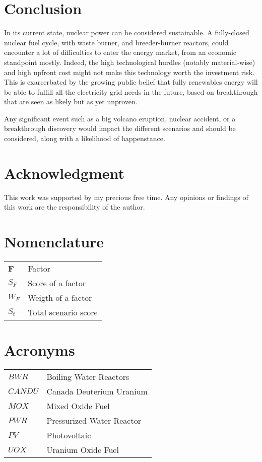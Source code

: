 \documentclass[IJPHM, 2017, 29]{PHMSociety}
\begin{document}
\section{Conclusion}
\label{sec:conclusion}

In its current state, nuclear power can be considered sustainable. A fully-closed nuclear fuel cycle, with waste burner, and breeder-burner reactors, could encounter a lot of difficulties to enter the energy market, from an economic standpoint mostly. Indeed, the high technological hurdles (notably material-wise) and high upfront cost might not make this technology worth the investment risk. This is exarcerbated by the growing public belief that fully renewables energy will be able to fulfill all the electricity grid needs in the future, based on breakthrough that are seen as likely but as yet unproven.

Any significant event such as a big volcano eruption, nuclear accident, or a breakthrough discovery would impact the different scenarios and should be considered, along with a likelihood of happenstance.


\section*{Acknowledgment}
This work was supported by my precious free time. Any opinions or findings of this work are the responsibility of the author.




\section*{Nomenclature}

\begin{tabular}{ l  l }
    \textbf{F}           &Factor\\
    \textbf{$S_F$}           &Score of a factor\\
    \textbf{$W_F$}           &Weigth of a factor\\
    \textbf{$S_t$}           &Total scenario score\\
 \end{tabular}


\section*{Acronyms}

\begin{tabular}{ l  l }
    $BWR$         &Boiling Water Reactors\\
    $CANDU$       &Canada Deuterium Uranium\\
    $MOX$         &Mixed Oxide Fuel\\
    $PWR$         &Pressurized Water Reactor\\
    $PV$          &Photovoltaic\\
    $UOX$         &Uranium Oxide Fuel
 \end{tabular}


\clearpage

\end{document}

